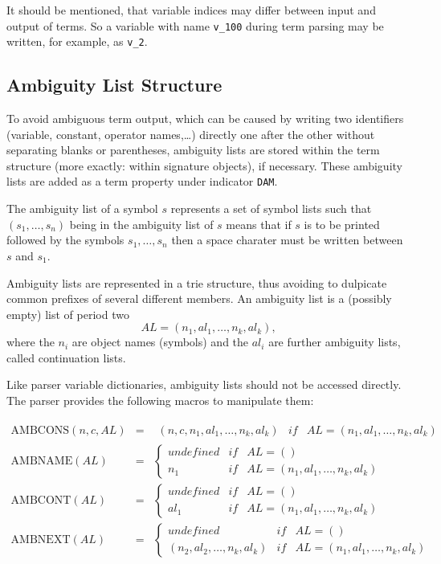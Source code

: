It should be mentioned, that variable indices may differ between input
and output of terms. So a variable with name {\tt v\_100} during term parsing
may be written, for example, as {\tt v\_2}.

\subsection{Ambiguity List Structure}

To avoid ambiguous term output, which can be caused by writing
two identifiers (variable, constant, operator names,\dots)
directly one after the other without separating blanks or parentheses,
ambiguity lists are stored within the term structure (more exactly: within
signature objects), if necessary.
These ambiguity lists are added as a term property under indicator {\tt DAM}.

The ambiguity list of a symbol $s$ represents a set of symbol lists
such that $(s_1,\ldots,s_n)$ being in the ambiguity list of $s$ means that
if $s$ is to be printed followed by the symbols $s_1, \ldots, s_n$ then
a space charater must be written between $s$ and $s_1$.

Ambiguity lists are represented in a trie structure, thus
avoiding to dulpicate common prefixes of several different members.
An ambiguity list is a (possibly empty) list of period two
$$ AL = (n_1,al_1,\dots,n_k,al_k), $$
where the $n_i$ are object names (symbols) and the $al_i$ are further
ambiguity lists, called continuation lists.

Like parser variable dictionaries, ambiguity lists should not be accessed
directly. The parser provides the following macros to manipulate
them:

$$\begin{array}{rcl}
  \mbox{AMBCONS}(n,c,AL) & = & \begin{array}{lcl}
     (n,c,n_1,al_1,\dots,n_k,al_k) & if &
     AL = (n_1,al_1,\dots,n_k,al_k) \end{array} \\
  \mbox{AMBNAME}(AL) & = & \left\{ \begin{array}{lcl}
     undefined & if & AL = () \\
     n_1 & if & AL = (n_1,al_1,\dots,n_k,al_k) \end{array}
   \right. \\ 
  \mbox{AMBCONT}(AL) & = & \left\{ \begin{array}{lcl}
     undefined & if & AL = () \\
     al_1 & if & AL = (n_1,al_1,\dots,n_k,al_k) \end{array}
   \right. \\ 
  \mbox{AMBNEXT}(AL) & = & \left\{ \begin{array}{lcl}
     undefined & if & AL = () \\
     (n_2,al_2,\dots,n_k,al_k) & if & AL = (n_1,al_1,\dots,n_k,al_k)
  \end{array} \right. \\
\end{array}$$

